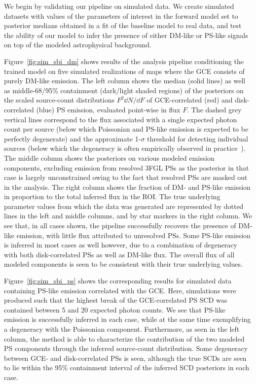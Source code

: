 \documentclass[prd,aps,10pt,nofootinbib,twocolumn,superscriptaddress,preprintnumbers,balancelastpage,longbibliography]{revtex4-1}
\begin{document}
We begin by validating our pipeline on simulated \Fermi data. We create simulated datasets with values of the parameters of interest in the forward model set to posterior medians obtained in a fit of the baseline model to real \Fermi data, and test the ability of our model to infer the presence of either DM-like or PS-like signals on top of the modeled astrophysical background.

Figure~\ref{fig:sim_sbi_dm} shows results of the analysis pipeline conditioning the trained model on five simulated realizations of maps where the GCE consists of purely DM-like emission. The left column shows the median (solid lines) as well as middle-68/95\% containment (dark/light shaded regions) of the posteriors on the scaled source-count distributions $F^2 \dd N/\dd F$ of GCE-correlated (red) and disk-correlated (blue) PS emission, evaluated point-wise in flux $F$. The dashed grey vertical lines correspond to the flux associated with a single expected photon count per source (below which Poissonian and PS-like emission is expected to be perfectly degenerate) and the approximate 1-$\sigma$ threshold for detecting individual sources (below which the degeneracy is often empirically observed in practice~\cite{Chang:2019ars,Buschmann:2020adf}). The middle column shows the posteriors on various modeled emission components, excluding emission from resolved 3FGL PSs as the posterior in that case is largely unconstrained owing to the fact that resolved PSs are masked out in the analysis. The right column shows the fraction of DM- and PS-like emission in proportion to the total inferred flux in the ROI. The true underlying parameter values from which the data was generated are represented by dotted lines in the left and middle columns, and by star markers in the right column. We see that, in all cases shown, the pipeline successfully recovers the presence of DM-like emission, with little flux attributed to unresolved PSs. Some PS-like emission is inferred in most cases as well however, due to a combination of degeneracy with both disk-correlated PSs as well as DM-like flux. The overall flux of all modeled components is seen to be consistent with their true underlying values.

Figure~\ref{fig:sim_sbi_ps} shows the corresponding results for simulated data containing PS-like emission correlated with the GCE. Here, simulations were produced such that the highest break of the GCE-correlated PS SCD was contained between 5 and 20 expected photon counts. We see that PS-like emission is successfully inferred in each case, while at the same time exemplifying a degeneracy with the Poissonian component. Furthermore, as seen in the left column, the method is able to characterize the contribution of the two modeled PS components through the inferred source-count distribution. Some degeneracy between GCE- and disk-correlated PSs is seen, although the true SCDs are seen to lie within the 95\% containment interval of the inferred SCD posteriors in each case.
\end{document}
